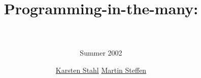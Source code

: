 \documentclass[ps,landscape,accumulate,economy,slideColor,nototal]{prosper}
\title{Programming-in-the-many: 
  \\ \Slime\\ }
\subtitle{ \small Summer 2002}
\author{%
  \href{http://www.informatik.uni-kiel.de/~kst}{Karsten Stahl}
  \quad
  \href{http://www.informatik.uni-kiel.de/~ms}{Martin Steffen}
  }
\begin{document}
\maketitle{}





%

%
%




\end{document}

